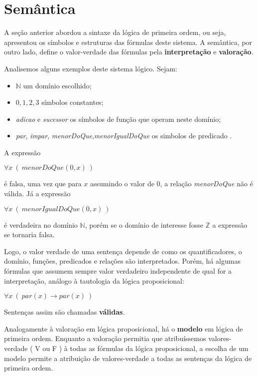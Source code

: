 \section{Semântica}
    
    A seção anterior abordou a sintaxe da lógica de primeira ordem, ou seja, apresentou os símbolos e estruturas das fórmulas deste sistema. A semântica, por outro lado, define o valor-verdade das fórmulas pela \textbf{interpretação} e \textbf{valoração}.
   
   Analisemos alguns exemplos deste sistema lógico.
   Sejam:
   \begin{itemize}
       \item $\mathbb{N}$ um domínio escolhido;
       \item $0, 1, 2, 3$ símbolos constantes;
       \item \textit{adicao} e \textit{sucessor} os símbolos de função que operam neste domínio;
       \item  \textit{par}, \textit{impar}, \textit{menorDoQue},\textit{menorIgualDoQue} os simbolos de predicado .
   \end{itemize}
    A expressão 
   \begin{center}
       $\forall x \ ( \ menorDoQue(0, x) \ )$
   \end{center}
   
   é falsa, uma vez que para $x$ assumindo o valor de $0$, a relação \textit{menorDoQue} não é válida. Já a expressão
   
   \begin{center}
       $\forall x \ ( \ menorIgualDoQue( 0, x) \ )$
   \end{center}
    
    é verdadeira no domínio $\mathbb{N}$, porém se o domínio de interesse fosse $\mathbb{Z}$ a expressão se tornaria falsa.
    
    Logo, o valor verdade de uma sentença depende de como os quantificadores, o domínio, funções, predicados e relações são interpretados. 
    Porém, há algumas fórmulas que assumem sempre valor verdadeiro independente de qual for a interpretação, análogo à tautologia da lógica proposicional:
    
    \begin{center}
        $\forall x \ ( \  par(x) \rightarrow par(x) \ )$
    \end{center}
    
    Sentenças assim são chamadas \textbf{válidas}.
    
    Analogamente à valoração em lógica proposicional, há o \textbf{modelo} em lógica de primeira ordem. Enquanto a valoração permitia que atribuíssemos valores-verdade ( V ou F ) à todas as fórmulas da lógica proposicional, a escolha de um modelo permite a atribuição de valores-verdade a todas as sentenças da lógica de primeira ordem.
    
